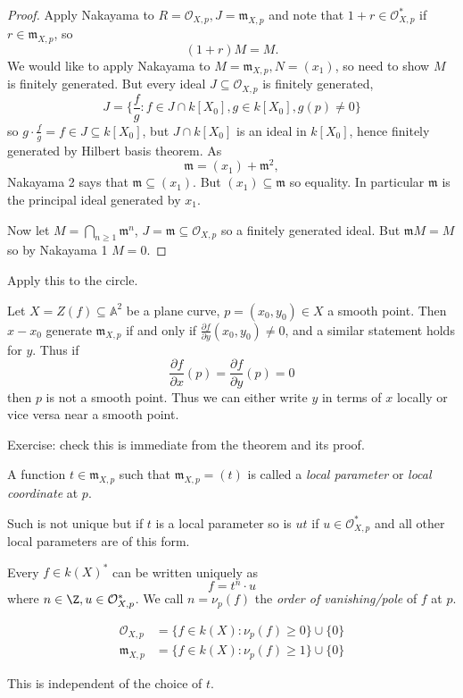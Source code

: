 \documentclass[a4paper]{article}
\renewcommand{\A}{\mathbb{A}}
\begin{document}
\begin{proof}
  Apply Nakayama to \(R = \mathcal O_{X, p}, J = \mathfrak m_{X, p}\) and note that \(1 + r \in \mathcal O_{X, p}^*\) if \(r \in \mathfrak m_{X, p}\), so
  \[
    (1 + r) M = M.
  \]
  We would like to apply Nakayama to \(M = \mathfrak m_{X, p}, N = (x_1)\), so need to show \(M\) is finitely generated. But every ideal \(J \subseteq \mathcal O_{X, p}\) is finitely generated,
  \[
    J = \{\frac{f}{g}: f \in J \cap k[X_0], g \in k[X_0], g(p) \neq 0\}
  \]
  so \(g \cdot \frac{f}{g} = f \in J \subseteq k[X_0]\), but \(J \cap k[X_0]\) is an ideal in \(k[X_0]\), hence finitely generated by Hilbert basis theorem. As
  \[
    \mathfrak m = (x_1) + \mathfrak m^2,
  \]
  Nakayama 2 says that \(\mathfrak m \subseteq (x_1)\). But \((x_1) \subseteq \mathfrak m\) so equality. In particular \(\mathfrak m\) is the principal ideal generated by \(x_1\).

  Now let \(M = \bigcap_{n \geq 1} \mathfrak m^n\), \(J = \mathfrak m \subseteq \mathcal O_{X, p}\) so a finitely generated ideal. But \(\mathfrak m M = M\) so by Nakayama 1 \(M = 0\).
\end{proof}

\begin{ex}
  Apply this to the circle.
\end{ex}

Let \(X = Z(f) \subseteq \A^2\) be a plane curve, \(p = (x_0, y_0) \in X\) a smooth point. Then \(x- x_0\) generate \(\mathfrak m_{X, p}\) if and only if \(\frac{\partial f}{\partial y}(x_0, y_0) \neq 0\), and a similar statement holds for \(y\). Thus if
\[
  \frac{\partial f}{\partial x}(p) = \frac{\partial f}{\partial y}(p) = 0
\]
then \(p\) is not a smooth point. Thus we can either write \(y\) in terms of \(x\) locally or vice versa near a smooth point.

Exercise: check this is immediate from the theorem and its proof.

\begin{definition}
  A function \(t \in \mathfrak m_{X, p}\) such that \(\mathfrak m_{X, p} = (t)\) is called a \emph{local parameter} or \emph{local coordinate} at \(p\).
\end{definition}

Such is not unique but if \(t\) is a local parameter so is \(ut\) if \(u \in \mathcal O_{X, p}^*\) and all other local parameters are of this form.

\begin{corollary}
  Every \(f \in k(X)^*\) can be written uniquely as
  \[
    f = t^n \cdot u
  \]
  where \(n \in \Z, u \in \mathcal O_{X, p}^*\). We call \(n = \nu_p(f)\) the \emph{order of vanishing/pole} of \(f\) at \(p\).

  \begin{align*}
    \mathcal O_{X, p} &= \{f \in k(X): \nu_p(f) \geq 0\} \cup \{0\} \\
    \mathfrak m_{X, p} &= \{f \in k(X): \nu_p(f) \geq 1\} \cup \{0\}
  \end{align*}
\end{corollary}
This is independent of the choice of \(t\).
\end{document}

